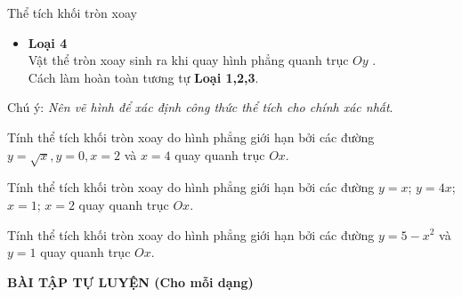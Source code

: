\begin{dang}{Thể tích khối tròn xoay}
\begin{itemize}
		\item \textbf{Loại 4}\\
		Vật thể tròn xoay sinh ra khi quay hình phẳng quanh trục $Oy$ . \\Cách làm hoàn toàn tương tự \textbf{Loại 1,2,3}.
	\end{itemize}
	
	\note
	{Chú ý:} \textit{Nên vẽ hình để xác định công thức thể tích cho chính xác nhất}.
\end{dang}
\begin{vd}%
	Tính thể tích khối tròn xoay do hình phẳng giới hạn bởi các đường $y=\sqrt{x},y=0, x=2$ và $x=4$ quay quanh trục $Ox$.
	
\end{vd}
\begin{vd}
	Tính thể tích khối tròn xoay do hình phẳng  giới hạn bởi các đường $y  = x$; $y = 4x$; $x=1$; $x=2$  quay quanh trục $Ox$.
\end{vd}

\begin{vd}%
	Tính thể tích khối tròn xoay do hình phẳng giới hạn bởi các đường $y  = 5 - x^2$ và $y = 1$ quay quanh trục $Ox$.
\end{vd}

\begin{center}
	\textbf{BÀI TẬP TỰ LUYỆN (Cho mỗi dạng)}
\end{center}


